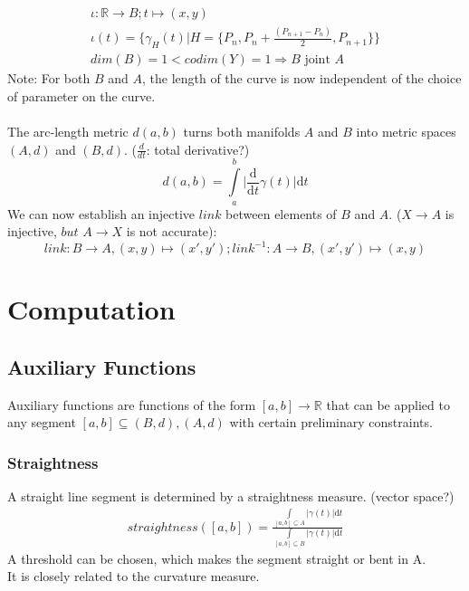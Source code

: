 \documentclass{article}
\begin{document}
\begin{align}
\iota: \mathbb{R} \rightarrow B; t \mapsto (x,y)\\
\iota(t) = \{ \gamma_{H}(t)\lvert H=\{P_{n},P_{n}+\frac{(P_{n+1}-P_{n})}{2},P_{n+1}\}\}\\
dim(B)=1<codim(Y)=1 \Rightarrow B \text{ joint } A
\end{align}
Note: For both $B$ and $A$, the length of the curve is now independent of the choice of parameter on the curve. ~\cite[]{Taimanov}\\\\
The arc-length metric $d(a,b)$ turns both manifolds $A$ and $B$ into metric spaces $(A,d)$ and $(B,d)$. ($\frac{d}{dt}$: total derivative?)
\begin{equation}
d(a,b) = \int \limits _{a}^{b}\lvert \frac{\mathrm{d}}{\mathrm{d}t}\gamma(t)\rvert \mathrm{d}t
\end{equation}
We can now establish an injective $link$ between elements of $B$ and $A$. ($X \rightarrow A$ is injective, $but$ $A \rightarrow X$ is not accurate):
\begin{equation}
link: B \rightarrow A, (x,y) \mapsto (x',y'); link^{-1}: A \rightarrow B, (x',y') \mapsto (x,y)
\end{equation}
\section{Computation}

\subsection{Auxiliary Functions}

Auxiliary functions are functions of the form $[a,b] \rightarrow \mathbb{R}$ that can be applied to any segment $[a,b] \subseteq (B,d),(A,d)$ with certain preliminary constraints.

\subsubsection{Straightness}
A straight line segment is determined by a straightness measure. (vector space?)\\
\begin{align}
straightness([a,b])=\frac{\int \limits _{[a,b] \subseteq A}\lvert\gamma(t)\rvert\mathrm{d}t}{\int \limits _{[a,b] \subseteq B}\lvert\gamma(t)\rvert\mathrm{d}t}
\end{align}
A threshold can be chosen, which makes the segment straight or bent in A.\\
It is closely related to the curvature measure.
\end{document}
